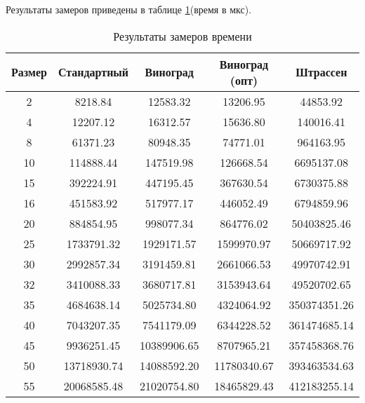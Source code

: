 Результаты замеров приведены в таблице \ref{tbl:time_mes}(время в мкс).

\begin{table}[h]
    \begin{center}
        \begin{threeparttable}
        \captionsetup{justification=raggedright,singlelinecheck=off}
        \caption{Результаты замеров времени}
        \label{tbl:time_mes}
        \begin{tabular}{|c|c|c|c|c|}
            \hline
            Размер & Стандартный & Виноград & Виноград (опт) & Штрассен \\ 
            \hline
            2 & 8218.84 & 12583.32 & 13206.95 & 44853.92 \\ 
            \hline
            4 & 12207.12 & 16312.57 & 15636.80 & 140016.41 \\ 
            \hline
            8 & 61371.23 & 80948.35 & 74771.01 & 964163.95 \\ 
            \hline
            10 & 114888.44 & 147519.98 & 126668.54 & 6695137.08 \\ 
            \hline
            15 & 392224.91 & 447195.45 & 367630.54 & 6730375.88 \\ 
            \hline
            16 & 451583.92 & 517977.17 & 446052.49 & 6794859.96 \\ 
            \hline
            20 & 884854.95 & 998077.34 & 864776.02 & 50403825.46 \\ 
            \hline
            25 & 1733791.32 & 1929171.57 & 1599970.97 & 50669717.92 \\ 
            \hline
            30 & 2992857.34 & 3191459.81 & 2661066.53 & 49970742.91 \\ 
            \hline
            32 & 3410088.33 & 3680717.81 & 3153943.64 & 49520702.65 \\ 
            \hline
            35 & 4684638.14 & 5025734.80 & 4324064.92 & 350374351.26 \\ 
            \hline
            40 & 7043207.35 & 7541179.09 & 6344228.52 & 361474685.14 \\ 
            \hline
            45 & 9936251.45 & 10389906.65 & 8707965.21 & 357458368.76 \\ 
            \hline
            50 & 13718930.74 & 14088592.20 & 11780340.67 & 393463534.63 \\ 
            \hline
            55 & 20068585.48 & 21020754.80 & 18465829.43 & 412183255.14 \\ 
            \hline

\end{tabular}
\end{threeparttable}
\end{center}
\end{table}
